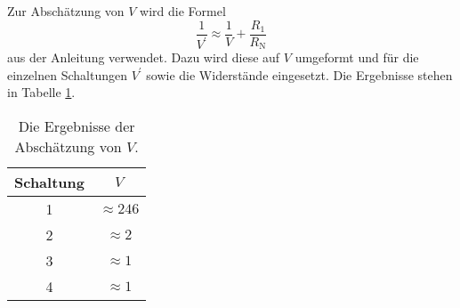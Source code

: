 \documentclass[
  bibliography=totoc,     %
  captions=tableheading,  %
  titlepage=firstiscover, %
]{scrartcl}
\begin{document}
\noindent
Zur Abschätzung von $V$ wird die Formel
\begin{equation}
  \frac{1}{V^\prime} \approx \frac{1}{V}+\frac{R_1}{R_\text{N}}
\end{equation}
aus der Anleitung verwendet. Dazu wird diese auf $V$ umgeformt und für die einzelnen Schaltungen
$V^\prime$ sowie die Widerstände eingesetzt.
Die Ergebnisse stehen in Tabelle \ref{tab:vabsch}.
\begin{table}[H]
  \centering
  \caption{Die Ergebnisse der Abschätzung von $V$.}
  \label{tab:vabsch}
  \begin{tabular}{c c}
    \toprule
    Schaltung & $V$\\
    \midrule
    1 & $\approx 246$ \\
    2 & $\approx 2  $ \\
    3 & $\approx 1  $ \\
    4 & $\approx 1  $ \\
    \bottomrule
  \end{tabular}
\end{table}
\end{document}
